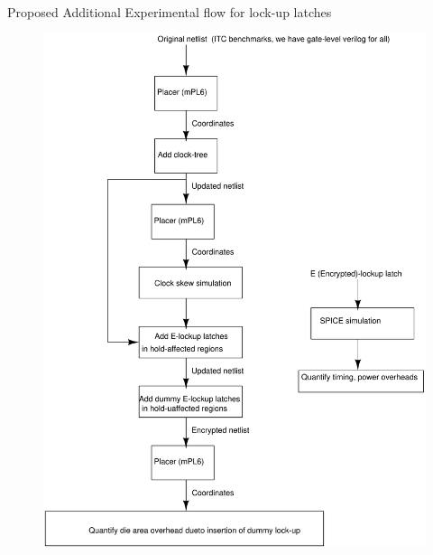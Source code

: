 \begin{frame}{Proposed Additional Experimental flow for lock-up latches}
	\begin{figure}[!htbp]
		\begin{center}
		\includegraphics[scale=0.16]{fig/experiments-flow.pdf}
		\end{center}
	\end{figure}
\end{frame}
